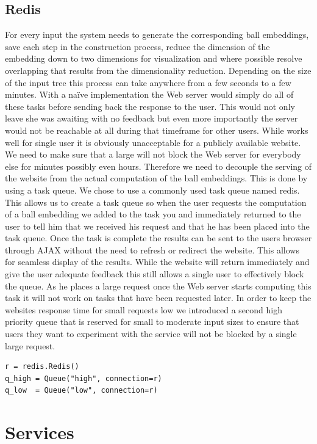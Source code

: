 \documentclass[]{article}
\begin{document}
\subsection{Redis}
\label{sec::redis}
For every input the system needs to generate the corresponding ball embeddings, save each step in the construction process, reduce the dimension of the embedding down to two dimensions for visualization and where possible resolve overlapping that results from the dimensionality reduction. Depending on the size of the input tree this process can take anywhere from a few seconds to a few minutes. With a naïve implementation the Web server would simply do all of these tasks before sending back the response to the user. This would not only leave she was awaiting with no feedback but even more importantly the server would not be reachable at all during that timeframe for other users. While works well for single user it is obviously unacceptable for a publicly available website. We need to make sure that a large will not block the Web server for everybody else for minutes possibly even hours. Therefore we need to decouple the serving of the website from the actual computation of the ball embeddings. This is done by using a task queue.
We chose to use a commonly used task queue named redis. This allows us to create a task queue so when the user requests the computation of a ball embedding we added to the task you and immediately returned to the user to tell him that we received his request and that he has been placed into the task queue. Once the task is complete the results can be sent to the users browser through AJAX without the need to refresh or redirect the website. This allows for seamless display of the results. While the website will return immediately and give the user adequate feedback this still allows a single user to effectively block the queue. As he places a large request once the Web server starts computing this task it will not work on tasks that have been requested later. In order to keep the websites response time for small requests low we introduced a second high priority queue that is reserved for small to moderate input sizes to ensure that users they want to experiment with the service will not be blocked by a single large request.
\begin{lstlisting}
r = redis.Redis()
q_high = Queue("high", connection=r)
q_low  = Queue("low", connection=r)  
\end{lstlisting}

\section{Services}
\end{document}
